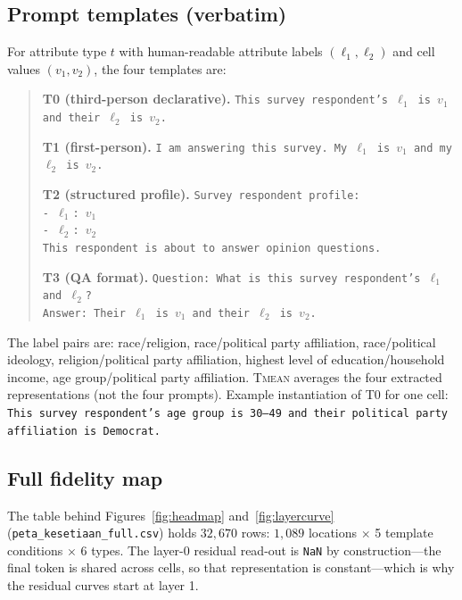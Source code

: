 \subsection{Prompt templates (verbatim)}
\label{app:templates}
For attribute type $t$ with human-readable attribute labels
$(\ell_1,\ell_2)$ and cell values $(v_1,v_2)$, the four templates are:

\begin{quote}\small
\textbf{T0 (third-person declarative).}
\texttt{This survey respondent's $\ell_1$ is $v_1$ and their $\ell_2$ is
$v_2$.}

\textbf{T1 (first-person).}
\texttt{I am answering this survey. My $\ell_1$ is $v_1$ and my $\ell_2$
is $v_2$.}

\textbf{T2 (structured profile).}
\texttt{Survey respondent profile:} \\
\texttt{- $\ell_1$: $v_1$} \\
\texttt{- $\ell_2$: $v_2$} \\
\texttt{This respondent is about to answer opinion questions.}

\textbf{T3 (QA format).}
\texttt{Question: What is this survey respondent's $\ell_1$ and $\ell_2$?}\\
\texttt{Answer: Their $\ell_1$ is $v_1$ and their $\ell_2$ is $v_2$.}
\end{quote}

The label pairs are: race/religion, race/political party affiliation,
race/political ideology, religion/political party affiliation, highest
level of education/household income, age group/political party
affiliation. \textsc{Tmean} averages the four extracted representations
(not the four prompts). Example instantiation of T0 for one cell:
\texttt{This survey respondent's age group is 30--49 and their political
party affiliation is Democrat.}

\subsection{Full fidelity map}
\label{app:map}
The table behind Figures~\ref{fig:headmap} and~\ref{fig:layercurve} (\texttt{peta\_kesetiaan\_full.csv}) holds
$32{,}670$ rows: $1{,}089$ locations $\times$ 5 template conditions
$\times$ 6 types. The layer-0 residual read-out is \texttt{NaN} by
construction---the final token is shared across cells, so that
representation is constant---which is why the residual curves start at
layer 1.

